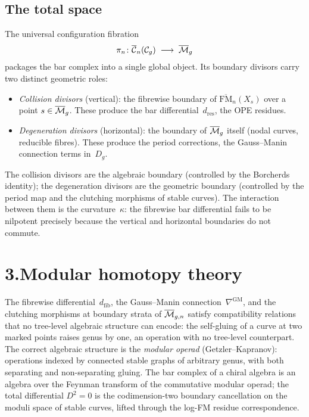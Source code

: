 \subsection*{The total space}

The universal configuration fibration
\[
\pi_n\colon
\overline{\mathcal C}_n(\mathcal C_g)
\;\longrightarrow\;
\overline{\mathcal{M}}_g
\]
packages the bar complex into a single global object. Its boundary
divisors carry two distinct geometric roles:
\begin{itemize}
\item \emph{Collision divisors} (vertical): the fibrewise boundary
of $\overline{\mathrm{FM}}_n(X_s)$ over a point
$s\in\overline{\mathcal{M}}_g$. These produce the bar
differential~$d_{\mathrm{res}}$, the OPE residues.
\item \emph{Degeneration divisors} (horizontal): the boundary of
$\overline{\mathcal{M}}_g$ itself (nodal curves, reducible
fibres). These produce the period corrections, the
Gauss--Manin connection terms in~$D_g$.
\end{itemize}
The collision divisors are the algebraic boundary (controlled by
the Borcherds identity); the degeneration divisors are the
geometric boundary (controlled by the period map and the
clutching morphisms of stable curves). The interaction between them
is the curvature~$\kappa$: the fibrewise bar differential fails to
be nilpotent precisely because the vertical and horizontal
boundaries do not commute.


\section*{3.\quad Modular homotopy theory}

\medskip

\noindent
The fibrewise differential~$d_{\mathrm{fib}}$, the Gauss--Manin
connection~$\nabla^{\mathrm{GM}}$, and the clutching morphisms at
boundary strata of $\overline{\mathcal{M}}_{g,n}$ satisfy compatibility
relations that no tree-level algebraic structure can encode: the
self-gluing of a curve at two marked points raises genus by one,
an operation with no tree-level counterpart. The correct algebraic
structure is the \emph{modular operad} (Getzler--Kapranov):
operations indexed by connected stable graphs of arbitrary genus,
with both separating and non-separating gluing. The bar complex of a
chiral algebra is an algebra over the Feynman transform of the
commutative modular operad; the total differential $D^2 = 0$ is
the codimension-two boundary cancellation on the moduli space of
stable curves, lifted through the log-FM residue correspondence.

